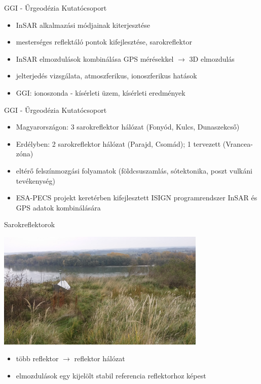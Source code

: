 \documentclass{beamer}
\begin{document}
\begin{frame}{GGI - Űrgeodézia Kutatócsoport}

\begin{itemize}
    \item InSAR alkalmazási módjainak kiterjesztése
    \item mesterséges reflektáló pontok kifejlesztése, sarokreflektor
    \item InSAR elmozdulások kombinálása GPS mérésekkel $\rightarrow$ 3D elmozdulás
    \item jelterjedés vizsgálata, atmoszferikus, ionoszferikus hatások
    \item GGI: ionoszonda - kísérleti üzem, kísérleti eredmények
\end{itemize}

\end{frame}


\begin{frame}{GGI - Űrgeodézia Kutatócsoport}

\begin{itemize}
    \item Magyarországon: 3 sarokreflektor hálózat (Fonyód, Kulcs, Dunaszekcső)
    \item Erdélyben: 2 sarokreflektor hálózat (Parajd, Csomád);
    1 tervezett (Vrancea-zóna)
    \item eltérő felszínmozgási folyamatok (földcsuszamlás, sótektonika,
    poszt vulkáni tevékenység)
    \item ESA-PECS projekt keretérben kifejlesztett ISIGN programrendszer
    InSAR és GPS adatok kombinálására
\end{itemize}

\end{frame}


\begin{frame}{Sarokreflektorok}

\begin{center}
\includegraphics[width=0.75\textwidth]{dszekcso_refl_3.jpg}
\end{center}

\begin{itemize}
    \item több reflektor $\rightarrow$ reflektor hálózat
    \item elmozdulások egy kijelölt stabil referencia reflektorhoz képest
\end{itemize}

\end{frame}
\end{document}

